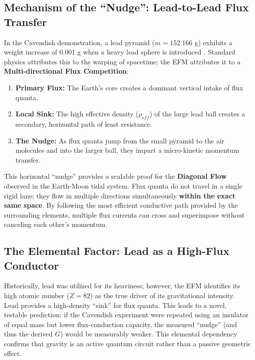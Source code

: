 \documentclass[11pt, a4paper]{article}
\begin{document}
\subsection{Mechanism of the ``Nudge'': Lead-to-Lead Flux Transfer}
In the Cavendish demonstration, a lead pyramid ($m = 152.166$ g) exhibits a weight increase of $0.001$ g when a heavy lead sphere is introduced \cite{flashminute2026}. Standard physics attributes this to the warping of spacetime; the EFM attributes it to a \textbf{Multi-directional Flux Competition}:
\begin{enumerate}
  \item \textbf{Primary Flux:} The Earth’s core creates a dominant vertical intake of flux quanta.
  \item \textbf{Local Sink:} The high effective density ($\rho_{eff}$) of the large lead ball creates a secondary, horizontal path of least resistance.
  \item \textbf{The Nudge:} As flux quanta jump from the small pyramid to the air molecules and into the larger ball, they impart a micro-kinetic momentum transfer.
\end{enumerate}

This horizontal ``nudge'' provides a scalable proof for the \textbf{Diagonal Flow} observed in the Earth-Moon tidal system. Flux quanta do not travel in a single rigid lane; they flow in multiple directions simultaneously \textbf{within the exact same space}. By following the most efficient conductive path provided by the surrounding elements, multiple flux currents can cross and superimpose without canceling each other's momentum.

\subsection{The Elemental Factor: Lead as a High-Flux Conductor}
Historically, lead was utilized for its heaviness; however, the EFM identifies its high atomic number ($Z=82$) as the true driver of its gravitational intensity. Lead provides a high-density ``sink'' for flux quanta. This leads to a novel, testable prediction: if the Cavendish experiment were repeated using an insulator of equal mass but lower flux-conduction capacity, the measured ``nudge'' (and thus the derived $G$) would be measurably weaker. This elemental dependency confirms that gravity is an active quantum circuit rather than a passive geometric effect.
\end{document}
